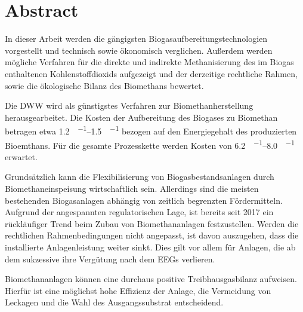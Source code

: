
\section*{Abstract}

\forceindent In dieser Arbeit werden die gängigsten Biogasaufbereitungstechnologien vorgestellt und technisch sowie ökonomisch verglichen. Außerdem werden mögliche Verfahren für die direkte und indirekte Methanisierung des im Biogas enthaltenen Kohlenstoffdioxids aufgezeigt und der derzeitige rechtliche Rahmen, sowie die ökologische Bilanz des Biomethans bewertet. \smallskip

\forceindent Die \gls{DWW} wird als günstigstes Verfahren zur Biomethanherstellung herausgearbeitet. Die Kosten der Aufbereitung des Biogases zu Biomethan betragen etwa \SIrange{1,2}{1,5}{\ct\per\kwh} bezogen auf den Energiegehalt des produzierten Bioemthans. Für die gesamte Prozesskette werden Kosten von \SIrange{6,2}{8,0}{\ct\per\kwh} erwartet. \smallskip

\forceindent Grundsätzlich kann die Flexibilisierung von Biogasbestandsanlagen durch Biomethaneinspeisung wirtschaftlich sein. Allerdings sind die meisten bestehenden Biogasanlagen abhängig von zeitlich begrenzten Fördermitteln. Aufgrund der angespannten regulatorischen Lage, ist bereits seit \SI{2017}{\relax} ein rückläufiger Trend beim Zubau von Biomethananlagen festzustellen. Werden die rechtlichen Rahmenbedingungen nicht angepasst, ist davon auszugehen, dass die installierte Anlagenleistung weiter sinkt. Dies gilt vor allem für Anlagen, die ab dem  sukzessive ihre Vergütung nach dem \glspl{EEG} verlieren. \smallskip

\forceindent Biomethananlagen können eine durchaus positive Treibhausgasbilanz aufweisen. Hierfür ist eine möglichst hohe Effizienz der Anlage, die Vermeidung von Leckagen und die Wahl des Ausgangssubstrat entscheidend.